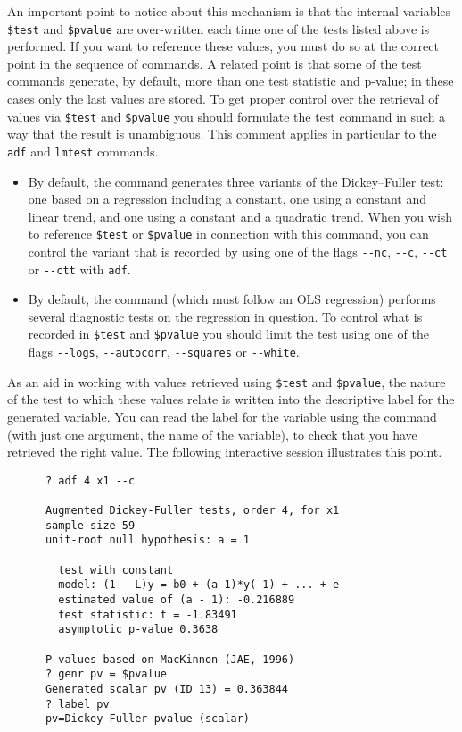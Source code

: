       An important point to notice about this mechanism is that the internal
      variables \verb+$test+ and \verb+$pvalue+ are
      over-written each time one of the tests listed above is performed.  If you
      want to reference these values, you must do so at the correct point in the
      sequence of  commands.
      A related point is that some of the test commands generate, by default, more
      than one test statistic and p-value; in these cases only the last values are
      stored. To get proper control over the retrieval of values via
      \verb+$test+ and \verb+$pvalue+ you should formulate
      the test command in such a way that the result is unambiguous.  This comment
      applies in particular to the \verb+adf+ and
      \verb+lmtest+ commands.
\begin{itemize}
\item By default, the  command generates three
	  variants of the Dickey--Fuller test: one based on a regression
	  including a constant, one using a constant and linear trend, and one using
	  a constant and a quadratic trend.  When you wish to reference
	  \verb+$test+ or \verb+$pvalue+ in connection with
	  this command, you can control the variant that is recorded by using one of
	  the flags \verb+--nc+, \verb+--c+,
	  \verb+--ct+ or \verb+--ctt+ with
	  \verb+adf+.
	
\item By default, the  command (which must
	  follow an OLS regression) performs several diagnostic tests on the
	  regression in question.  To control what is recorded in
	  \verb+$test+ and \verb+$pvalue+ you should limit
	  the test using one of the flags \verb+--logs+,
	  \verb+--autocorr+, \verb+--squares+ or
	  \verb+--white+.
	
\end{itemize}

As an aid in working with values retrieved using \verb+$test+
      and \verb+$pvalue+, the nature of the test to which these values
      relate is written into the descriptive label for the generated variable.  You
      can read the label for the variable using the 
      command (with just one argument, the name of the variable), to check that you
      have retrieved the right value.  The following interactive session illustrates
      this point.
\begin{verbatim}
      ? adf 4 x1 --c

      Augmented Dickey-Fuller tests, order 4, for x1
      sample size 59
      unit-root null hypothesis: a = 1

        test with constant
        model: (1 - L)y = b0 + (a-1)*y(-1) + ... + e
        estimated value of (a - 1): -0.216889
        test statistic: t = -1.83491
        asymptotic p-value 0.3638

      P-values based on MacKinnon (JAE, 1996)
      ? genr pv = $pvalue
      Generated scalar pv (ID 13) = 0.363844
      ? label pv    
      pv=Dickey-Fuller pvalue (scalar)\end{verbatim}


